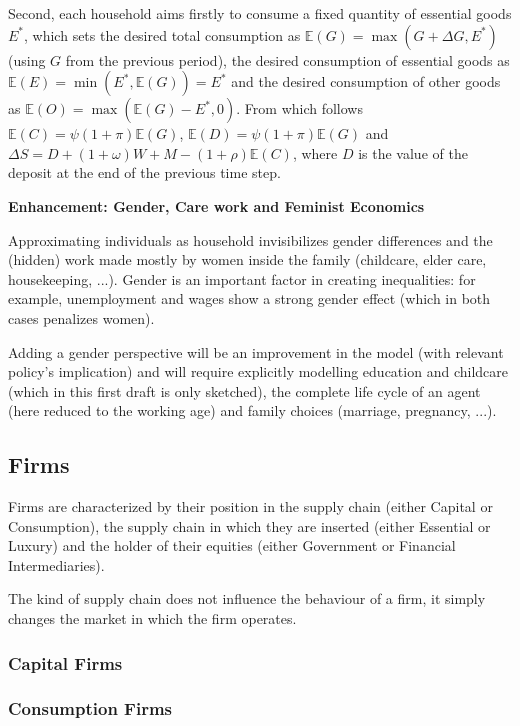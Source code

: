 \documentclass[a4paper, headings=standardclasses]{scrartcl}
\newenvironment{enh}[1][]{\begin{framed}\noindent\textbf{Enhancement: #1}\par}{\end{framed}}
\begin{document}
Second, each household aims firstly to consume a fixed quantity of essential goods $E^*$, which sets the desired total consumption as $\mathbb{E}(G) = \max(G + \Delta G, E^*)$ (using $G$ from the previous period), the desired consumption of essential goods as $\mathbb{E}(E) = \min(E^*, \mathbb{E}(G)) = E^*$ and the desired consumption of other goods as $\mathbb{E}(O) = \max(\mathbb{E}(G) - E^*, 0)$. From which follows $\mathbb{E}(C) = \psi (1+\pi) \mathbb{E}(G)$, $\mathbb{E}(D) = \psi (1+\pi) \mathbb{E}(G)$ and $\Delta S = D + (1+\omega) W + M - (1+\rho) \mathbb{E}(C)$, where $D$ is the value of the deposit at the end of the previous time step.

\begin{enh}[Gender, Care work and Feminist Economics]
	Approximating individuals as household invisibilizes gender differences and the (hidden) work made mostly by women inside the family (childcare, elder care, housekeeping, ...).
	Gender is an important factor in creating inequalities: for example, unemployment and wages show a strong gender effect (which in both cases penalizes women).

	Adding a gender perspective will be an improvement in the model (with relevant policy's implication) and will require explicitly modelling education and childcare (which in this first draft is only sketched), the complete life cycle of an agent (here reduced to the working age) and family choices (marriage, pregnancy, ...).
\end{enh}

\subsection{Firms}
Firms are characterized by their position in the supply chain (either Capital or Consumption), the supply chain in which they are inserted (either Essential or Luxury) and the holder of their equities (either Government or Financial Intermediaries).

The kind of supply chain does not influence the behaviour of a firm, it simply changes the market in which the firm operates.

\subsubsection{Capital Firms}

\subsubsection{Consumption Firms}
\end{document}
